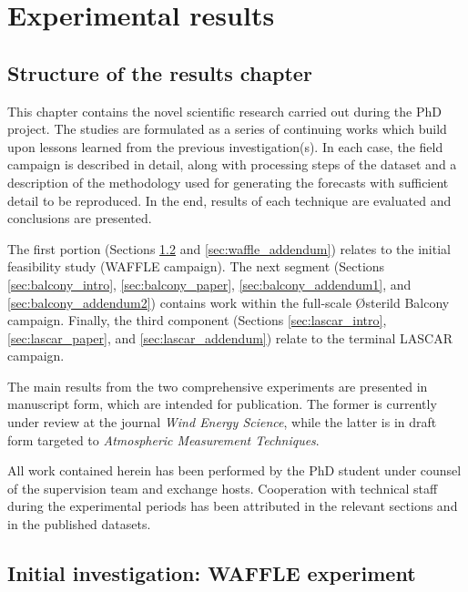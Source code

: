 \chapter{Experimental results}
\label{sec:results}

\clearpage
\section{Structure of the results chapter}
\label{sec:results_struct}

\bigskip

This chapter contains the novel scientific research carried out during the PhD project.
The studies are formulated as a series of continuing works which build upon lessons learned from the previous investigation(s).
In each case, the field campaign is described in detail, along with processing steps of the dataset and a description of the methodology used for generating the forecasts with sufficient detail to be reproduced. In the end, results of each technique are evaluated and conclusions are presented.

The first portion (Sections \ref{sec:waffle} and \ref{sec:waffle_addendum}) relates to the initial feasibility study (WAFFLE campaign).
The next segment (Sections \ref{sec:balcony_intro}, \ref{sec:balcony_paper}, \ref{sec:balcony_addendum1}, and \ref{sec:balcony_addendum2}) contains work within the full-scale {\O}sterild Balcony campaign. Finally, the third component (Sections \ref{sec:lascar_intro}, \ref{sec:lascar_paper}, and \ref{sec:lascar_addendum}) relate to the terminal LASCAR campaign.

The main results from the two comprehensive experiments are presented in manuscript form, which are intended for publication. The former is currently under review at the journal \textit{Wind Energy Science}, while the latter is in draft form targeted to \textit{Atmospheric Measurement Techniques}.

All work contained herein has been performed by the PhD student under counsel of the supervision team and exchange hosts. Cooperation with technical staff during the experimental periods has been attributed in the relevant sections and in the published datasets. 

\clearpage
\section{Initial investigation: WAFFLE experiment}
\label{sec:waffle}

